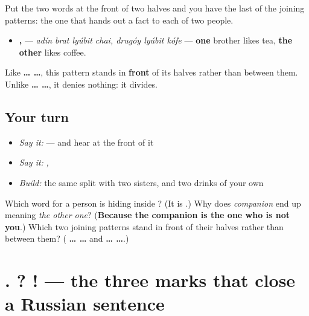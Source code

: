 \begin{grammarlens}[title={Grammar lens — \ru{один} … \ru{другой} …}]
Put the two words at the front of two halves and you have the last of the joining patterns: the one that hands out a fact to each of two people.

\begin{itemize}
\raggedright
  \item \textbf{   ,   } — \emph{adín brat lyúbit chai, drugóy lyúbit kófe} — \textbf{one} brother likes tea, \textbf{the other} likes coffee.
\end{itemize}

Like \textbf{ …  …}, this pattern stands in \textbf{front} of its halves rather than between them. Unlike \textbf{ …  …}, it denies nothing: it divides.
\end{grammarlens}

\subsection*{Your turn}
\begin{itemize}
\raggedright
  \item \emph{Say it:} \emph{} — and hear \emph{} at the front of it
  \item \emph{Say it:} \emph{   ,   }
  \item \emph{Build:} the same split with two sisters, and two drinks of your own
\end{itemize}

\begin{tcolorbox}[breakable,colback=teal!4,colframe=teal!35!black,title={Before you move on}]
Which word for a person is hiding inside \textbf{}? (It is \textbf{}.) Why does \emph{companion} end up meaning \emph{the other one}? (\textbf{Because the companion is the one who is not you}.) Which two joining patterns stand in front of their halves rather than between them? (\textbf{ …  …} and \textbf{ …  …}.)
\end{tcolorbox}
\section[. ? ! (tochka, vopros, vosklitsanie)]{. ? ! — the three marks that close a Russian sentence}

\label{lesson:RU-W08-tochka}




